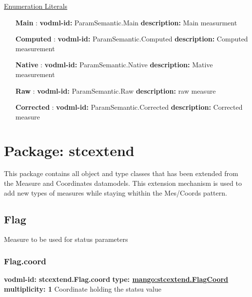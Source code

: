  \noindent \underline{Enumeration Literals}
  \vspace{-\parsep}
  \small
  \begin{itemize}
  
    \item[\textbf{Main}]: \textbf{vodml-id:} ParamSemantic.Main \newline
          \textbf{description:} Main measurment
    \item[\textbf{Computed}]: \textbf{vodml-id:} ParamSemantic.Computed \newline
          \textbf{description:} Computed measurement
    \item[\textbf{Native}]: \textbf{vodml-id:} ParamSemantic.Native \newline
          \textbf{description:} Mative measurement
    \item[\textbf{Raw}]: \textbf{vodml-id:} ParamSemantic.Raw \newline
          \textbf{description:} raw measure
    \item[\textbf{Corrected}]: \textbf{vodml-id:} ParamSemantic.Corrected \newline
          \textbf{description:} Corrected measure
  \end{itemize}
  \normalsize


\pagebreak
\section{Package: stcextend }


  This package contains all object and type classes that has been extended from the Measure and Coordinates datamodels. This extension mechanism is used to add new types of measures while staying whithin the Mes/Coords pattern.

  \subsection{Flag}
  \label{sect:stcextend.Flag}
    Measure to be used for status parameters

    \subsubsection{Flag.coord}
      \textbf{vodml-id: stcextend.Flag.coord} \newline
      \textbf{type: \hyperref[sect:stcextend.FlagCoord]{mango:stcextend.FlagCoord}} \newline
      \textbf{multiplicity: 1} \newline 
      Coordinate holding the statsu value

